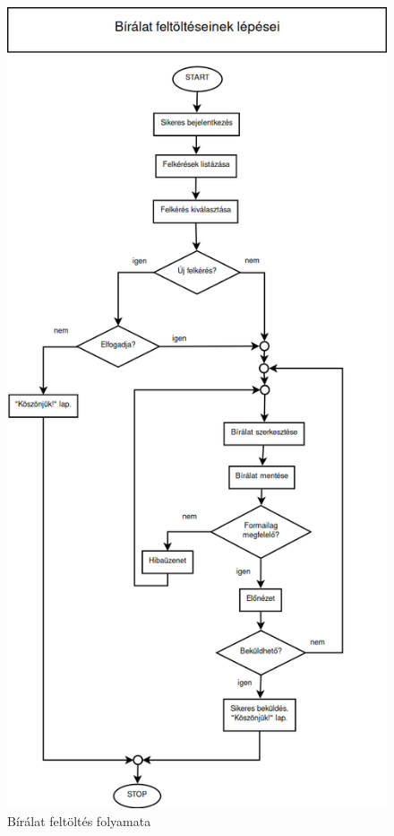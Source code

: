 \documentclass[a4paper,12pt]{article}
\begin{document}
\begin{figure}
\centering
\includegraphics[scale=0.45]{images/Folyamatabra/Biralat_Feltoltes.png}
\caption{Bírálat feltöltés folyamata}
\label{fig:Biralat_Feltoltes}
\end{figure}
\end{document}
